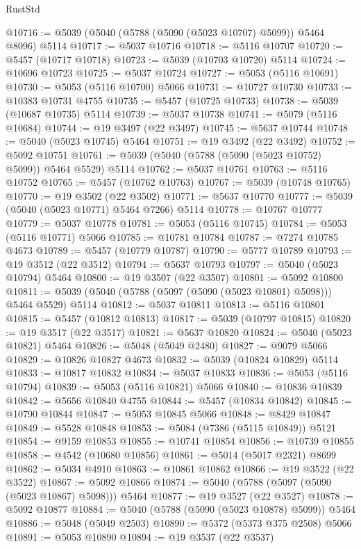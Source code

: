 \begin{lexlean}{RustStd}
\begin{coremodule}
@10716 := @5039 (@5040 (@5788 (@5090 (@5023 @10707) @5099)) @5464 @8096) @5114
@10717 := @5037 @10716
@10718 := @5116 @10707
@10720 := @5457 (@10717 @10718)
@10723 := @5039 (@10703 @10720) @5114
@10724 := @10696 @10723
@10725 := @5037 @10724
@10727 := @5053 (@5116 @10691)
@10730 := @5053 (@5116 @10700) @5066
@10731 := @10727 @10730
@10733 := @10383 @10731 @4755
@10735 := @5457 (@10725 @10733)
@10738 := @5039 (@10687 @10735) @5114
@10739 := @5037 @10738
@10741 := @5079 (@5116 @10684)
@10744 := @19 @3497 (@22 @3497)
@10745 := @5637 @10744
@10748 := @5040 (@5023 @10745) @5464
@10751 := @19 @3492 (@22 @3492)
@10752 := @5092 @10751
@10761 := @5039 (@5040 (@5788 (@5090 (@5023 @10752) @5099)) @5464 @5529) @5114
@10762 := @5037 @10761
@10763 := @5116 @10752
@10765 := @5457 (@10762 @10763)
@10767 := @5039 (@10748 @10765)
@10770 := @19 @3502 (@22 @3502)
@10771 := @5637 @10770
@10777 := @5039 (@5040 (@5023 @10771) @5464 @7266) @5114
@10778 := @10767 @10777
@10779 := @5037 @10778
@10781 := @5053 (@5116 @10745)
@10784 := @5053 (@5116 @10771) @5066
@10785 := @10781 @10784
@10787 := @7274 @10785 @4673
@10789 := @5457 (@10779 @10787)
@10790 := @5777 @10789
@10793 := @19 @3512 (@22 @3512)
@10794 := @5637 @10793
@10797 := @5040 (@5023 @10794) @5464
@10800 := @19 @3507 (@22 @3507)
@10801 := @5092 @10800
@10811 := @5039 (@5040 (@5788 (@5097 (@5090 (@5023 @10801) @5098))) @5464 @5529) @5114
@10812 := @5037 @10811
@10813 := @5116 @10801
@10815 := @5457 (@10812 @10813)
@10817 := @5039 (@10797 @10815)
@10820 := @19 @3517 (@22 @3517)
@10821 := @5637 @10820
@10824 := @5040 (@5023 @10821) @5464
@10826 := @5048 (@5049 @2480)
@10827 := @9079 @5066
@10829 := @10826 @10827 @4673
@10832 := @5039 (@10824 @10829) @5114
@10833 := @10817 @10832
@10834 := @5037 @10833
@10836 := @5053 (@5116 @10794)
@10839 := @5053 (@5116 @10821) @5066
@10840 := @10836 @10839
@10842 := @5656 @10840 @4755
@10844 := @5457 (@10834 @10842)
@10845 := @10790 @10844
@10847 := @5053 @10845 @5066
@10848 := @8429 @10847
@10849 := @5528 @10848
@10853 := @5084 (@7386 (@5115 @10849)) @5121
@10854 := @9159 @10853
@10855 := @10741 @10854
@10856 := @10739 @10855
@10858 := @4542 (@10680 @10856)
@10861 := @5014 (@5017 @2321) @8699
@10862 := @5034 @4910
@10863 := @10861 @10862
@10866 := @19 @3522 (@22 @3522)
@10867 := @5092 @10866
@10874 := @5040 (@5788 (@5097 (@5090 (@5023 @10867) @5098))) @5464
@10877 := @19 @3527 (@22 @3527)
@10878 := @5092 @10877
@10884 := @5040 (@5788 (@5090 (@5023 @10878) @5099)) @5464
@10886 := @5048 (@5049 @2503)
@10890 := @5372 (@5373 @375 @2508) @5066
@10891 := @5053 @10890
@10894 := @19 @3537 (@22 @3537)

\end{coremodule}
\end{lexlean}
